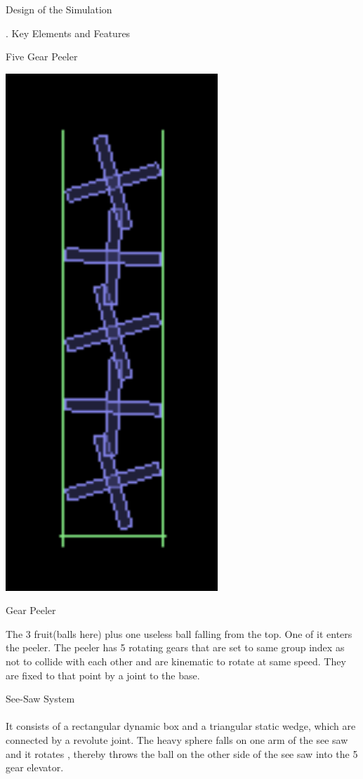 \documentclass[a4paper,11pt]{resume}
\begin{document}
\begin{rSection}{{\heading Design of the Simulation}}
\begin{rSubsection}{{. Key Elements and Features}}{}{}{}
\begin{rSubsection}{{ Five Gear Peeler}}{}{}{}
\begin{minipage}{0.15\textwidth}
\centering
\includegraphics[width=0.6\textwidth,scale=0.4]{5gear.png}
\label{fig:find}
\caption{     Gear Peeler}
\end{minipage}
\begin{minipage}{0.80\textwidth}
The 3 fruit(balls here) plus one useless ball falling from the top. One of it enters the peeler. The peeler has 5 rotating gears that are set to same group index as not to collide with each other and are kinematic to rotate at same speed. They are fixed to that point by a joint to the base.
\end{minipage}
\end{rSubsection}

\begin{rSubsection}{{ See-Saw System}}{}{}{}
\\ \\ 
It consists of a rectangular dynamic box and a triangular static wedge, which are connected by a revolute joint. The heavy sphere falls on one arm of the see saw and it rotates , thereby throws the ball on the other side of the see saw into the 5 gear elevator.
\end{rSubsection}


\end{rSubsection}
\end{rSection}
\end{document}
